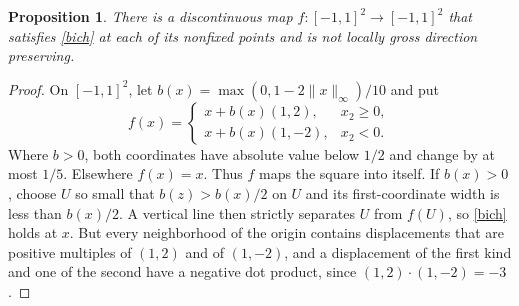\documentclass[11pt]{amsart}
\newtheorem{prop}[thm]{Proposition}
\theoremstyle{definition}
\theoremstyle{remark}
\numberwithin{equation}{section}
\begin{document}
\begin{prop}\label{prop:compare}
There is a discontinuous map $f\colon[-1,1]^2\to[-1,1]^2$ that satisfies \eqref{bich} at each of its nonfixed points and is not locally gross direction preserving.
\end{prop}

\begin{proof}
On $[-1,1]^2$, let $b(x)=\max(0,1-2\|x\|_\infty)/10$ and put
\[
 f(x)=
 \begin{cases}
     x+b(x)(1,2),&x_2\ge0,\\
     x+b(x)(1,-2),&x_2<0 .
 \end{cases}
\]
Where $b>0$, both coordinates have absolute value below $1/2$ and change by at most $1/5$. Elsewhere $f(x)=x$. Thus $f$ maps the square into itself. If $b(x)>0$, choose $U$ so small that $b(z)>b(x)/2$ on $U$ and its first-coordinate width is less than $b(x)/2$. A vertical line then strictly separates $U$ from $f(U)$, so \eqref{bich} holds at $x$. But every neighborhood of the origin contains displacements that are positive multiples of $(1,2)$ and of $(1,-2)$, and a displacement of the first kind and one of the second have a negative dot product, since $(1,2)\cdot(1,-2)=-3$.
\end{proof}
\end{document}
